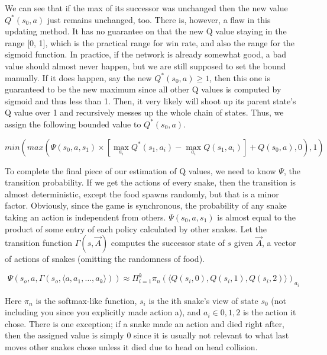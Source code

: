 \documentclass{article}
\begin{document}
We can see that if the max of its successor was unchanged then the new value
$Q^*(s_0,a)$ just remains unchanged, too. There is, however, a flaw in this
updating method. It has no guarantee on that the new Q value staying in the
range [0, 1], which is the practical range for win rate, and also the range for
the sigmoid function. In practice, if the network is already somewhat good, a
bad value should almost never happen, but we are still supposed to set the bound
manually. If it does happen, say the new $Q^*(s_0,a)\geq 1$, then this one is
guaranteed to be the new maximum since all other Q values is computed by sigmoid
and thus less than 1. Then, it very likely will shoot up its parent state's Q
value over 1 and recursively messes up the whole chain of states. Thus, we
assign the following bounded value to $Q^*(s_0,a)$.

\begin{equation}
  min(max(\Psi(s_0,a,s_1)\times [\max_{a_i}Q^*(s_1,a_i)-\max_{a_i}Q(s_1,a_i)]+Q(s_0,a),0),1)
\end{equation}

To complete the final piece of our estimation of Q values, we need to know
$\Psi$, the transition probability. If we get the actions of every snake, then
the transition is almost deterministic, except the food spawns randomly, but
that is a minor factor. Obviously, since the game is synchronous, the
probability of any snake taking an action is independent from others.
$\Psi(s_0,a,s_1)$ is almost equal to the product of some entry of each policy
calculated by other snakes. Let the transition function
$\Gamma(s,\overrightarrow{A})$ computes the successor state of $s$ given
$\overrightarrow{A}$, a vector of actions of snakes (omitting the randomness of
food).

\begin{equation}
  \Psi(s_o,a,\Gamma(s_o,\langle a, a_1, \ldots , a_k \rangle )) \approx \Pi^k_{i=1}\pi_n{(\langle Q(s_i,0),Q(s_i,1),Q(s_i,2) \rangle)}_{a_i}
\end{equation}

Here $\pi_n$ is the softmax-like function, $s_i$ is the ith snake's view of
state $s_0$ (not including you since you explicitly made action a), and $a_i
  \in {0,1,2}$ is the action it chose. There is one exception; if a snake made
an action and died right after, then the assigned value is simply 0 since it
is usually not relevant to what last moves other snakes chose unless it died
due to head on head collision.
\end{document}
